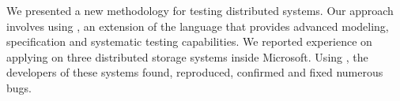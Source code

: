 We presented a new methodology for testing distributed systems. Our approach involves using \psharp, an extension of the \csharp language that provides advanced modeling, specification and systematic testing capabilities. We reported experience on applying \psharp on three distributed storage systems inside Microsoft. Using \psharp, the developers of these systems found, reproduced, confirmed and fixed numerous bugs.
